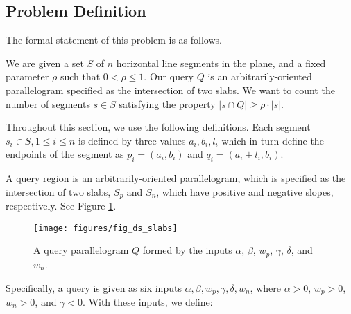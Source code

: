 \subsection{Problem Definition}
\label{:slabs:two:problem}

The formal statement of this problem is as follows.

\begin{problem}
We are given a set $S$ of $n$ horizontal line segments in the plane, and a fixed parameter $\rho$ such that $0 < \rho \leq 1$. Our query $Q$ is an arbitrarily-oriented parallelogram specified as the intersection of two slabs. We want to count the number of segments $s \in S$  satisfying the property $|s \cap Q| \geq \rho \cdot |s|$.
\end{problem}

Throughout this section, we use the following definitions. Each segment $s_i \in S, 1 \leq i \leq n$ is defined by three values $a_i, b_i, l_i$ which in turn define the endpoints of the segment as $p_i = (a_i, b_i)$ and $q_i = (a_i + l_i, b_i)$.

A query region is an arbitrarily-oriented parallelogram, which is specified as the intersection of two slabs, $S_p$ and $S_n$, which have positive and negative slopes, respectively. See Figure \ref{fig:slabs:two:ds}.

\begin{figure}[t]
\begin{center}
  \texttt{[image: figures/fig\_ds\_slabs]}
  \caption{A query parallelogram $Q$ formed by the inputs $\alpha$, $\beta$, $w_p$,
  $\gamma$, $\delta$, and $w_n$.}
  \label{fig:slabs:two:ds}
\end{center}
\end{figure}

Specifically, a query is given as six inputs $\alpha, \beta, w_p, \gamma, \delta, w_n$, where $\alpha > 0$, $w_p > 0$, $w_n > 0$, and $\gamma < 0$. With these inputs, we define:

